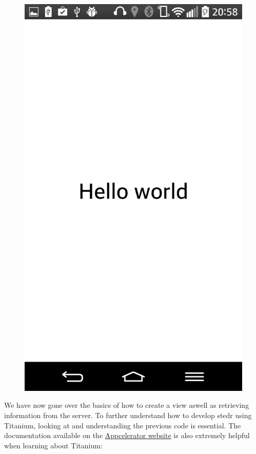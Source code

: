 \begin{figure}
\begin{center}
\includegraphics[scale=0.15]{guide/f11.png} 
\end{center}
\end{figure}

We have now gone over the basics of how to create a view aswell as retrieving information from the server. To further understand how to develop stedr using Titanium, looking at and understanding the previous code is essential. The documentation available on the \href{http://docs.appcelerator.com/titanium/3.0/}{Appcelerator website} is also extremely helpful when learning about Titanium:
